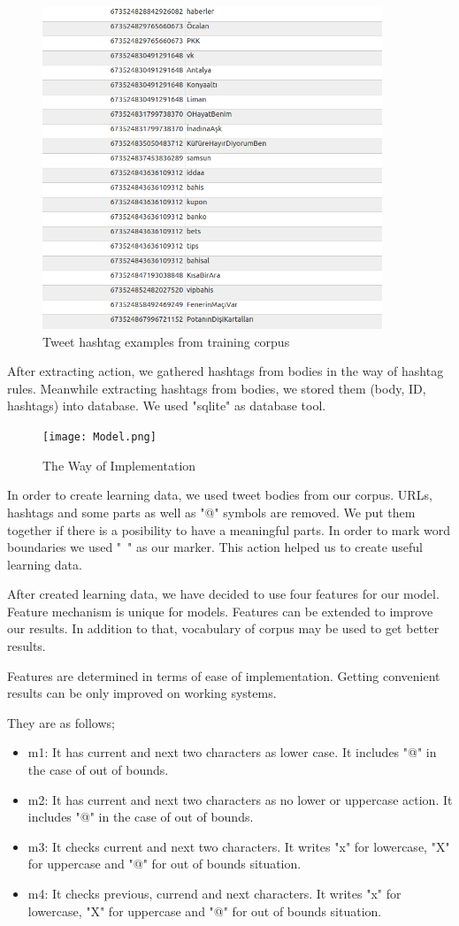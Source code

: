 \documentclass[12pt]{comjnl}
\begin{document}
\begin{figure}[htbp]
\centering
\includegraphics[width=4in]{hashtagdatabase.png}
\caption{Tweet hashtag examples from training corpus}\label{fig:api}
\end{figure}

After extracting action, we gathered hashtags from bodies in the way of hashtag rules. Meanwhile extracting hashtags from bodies, we stored them (body, ID, hashtags) into database. We used "sqlite" as database tool.

\begin{figure}[htbp]
\centering
\texttt{[image: Model.png]}
\caption{The Way of Implementation}\label{fig:model}
\end{figure}

In order to create learning data, we used tweet bodies from our corpus. URLs, hashtags and some parts as well as "@" symbols are removed. We put them together if there is a posibility to have a meaningful parts. In order to mark word boundaries we used "~" as our marker. This action helped us to create useful learning data.

After created learning data, we have decided to use four features for our model. Feature mechanism is unique for models. Features can be extended to improve our results. In addition to that, vocabulary of corpus may be used to get better results.

Features are determined in terms of ease of implementation. Getting convenient results can be only improved on working systems.

They are as follows;
\begin{itemize}
\item m1: It has current and next two characters as lower case. It includes "@" in the case of out of bounds.
\item m2: It has current and next two characters as no lower or uppercase action. It includes "@" in the case of out of bounds.
\item m3: It checks current and next two characters. It writes "x" for lowercase, "X" for uppercase and "@" for out of bounds situation.
\item m4: It checks previous, currend and next characters. It writes "x" for lowercase, "X" for uppercase and "@" for out of bounds situation.
\end{itemize}
\end{document}
